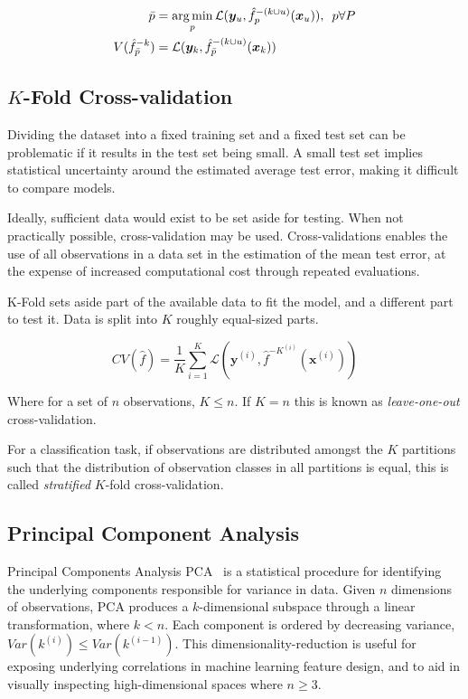 \begin{align}
  \bar{p} &= \operatorname*{arg\,min}_p \mathcal{L}(\bm{y}_u, \hat{f}_p^{-(k \cup u)}(\bm{x}_u)), \hspace{.5em} p \forall P\\
  V(\hat{f}_{\bar{p}}^{-k}) &= \mathcal{L}(\bm{y}_k, \hat{f}_{\bar{p}}^{-(k \cup u)}(\bm{x}_k))
\end{align}

\subsection{$K$-Fold Cross-validation}

Dividing the dataset into a fixed training set and a fixed test set can be problematic if it results in the test set being small. A small test set implies statistical uncertainty around the estimated average test error, making it difficult to compare models.

Ideally, sufficient data would exist to be set aside for testing. When not practically possible, cross-validation may be used. Cross-validations enables the use of all observations in a data set in the estimation of the mean test error, at the expense of increased computational cost through repeated evaluations.

K-Fold sets aside part of the available data to fit the model, and a different part to test it. Data is split into $K$ roughly equal-sized parts.

\begin{equation}
  CV(\hat{f}) = \frac{1}{K}\sum_{i=1}^K \mathcal{L}(\bm{y}^{(i)}, \hat{f}^{-K^{(i)}}(\bm{x}^{(i)}))
\end{equation}

Where for a set of $n$ observations, $K \le n$. If $K=n$ this is known as \emph{leave-one-out} cross-validation.

For a classification task, if observations are distributed amongst the $K$ partitions such that the distribution of observation classes in all partitions is equal, this is called \emph{stratified} $K$-fold cross-validation.


\subsection{Principal Component Analysis}

Principal Components Analysis PCA~\cite{Jolliffe2011} is a statistical procedure for identifying the underlying components responsible for variance in data. Given $n$ dimensions of observations, PCA produces a $k$-dimensional subspace through a linear transformation, where $k < n$. Each component is ordered by decreasing variance, $Var(k^{(i)}) \le Var(k^{(i-1)})$. This dimensionality-reduction is useful for exposing underlying correlations in machine learning feature design, and to aid in visually inspecting high-dimensional spaces where $n \ge 3$.

